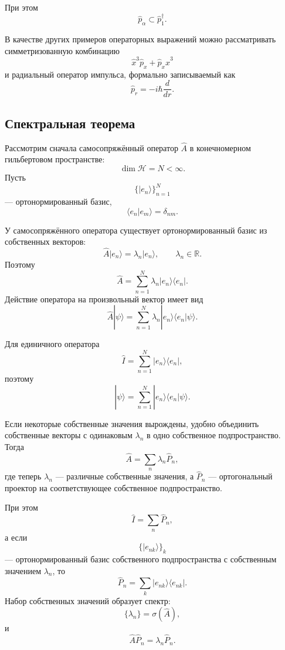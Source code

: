 \documentclass[12pt,a4paper]{article}
\begin{document}
При этом
\[
    \hat p_\alpha
    \subset
    \hat p_1^\dagger.
\]

В качестве других примеров операторных выражений можно рассматривать
симметризованную комбинацию
\[
    \boxed{
        \hat x^3\hat p_x
        +
        \hat p_x\hat x^3
    }
\]
и радиальный оператор импульса, формально записываемый как
\[
    \boxed{
        \hat p_r
        =
        -i\hbar\frac{d}{dr}
    }.
\]


\subsection{Спектральная теорема}

Рассмотрим сначала самосопряжённый оператор $\hat A$ в
конечномерном гильбертовом пространстве:
\[
    \dim\mathcal H=N<\infty.
\]
Пусть
\[
    \{|e_n\rangle\}_{n=1}^{N}
\]
--- ортонормированный базис,
\[
    \langle e_n|e_m\rangle
    =
    \delta_{nm}.
\]

У самосопряжённого оператора существует ортонормированный базис из
собственных векторов:
\[
    \boxed{
        \hat A|e_n\rangle
        =
        \lambda_n|e_n\rangle,
        \qquad
        \lambda_n\in\mathbb R
    }.
\]
Поэтому
\[
    \boxed{
        \hat A
        =
        \sum_{n=1}^{N}
        \lambda_n
        |e_n\rangle\langle e_n|
    }.
\]
Действие оператора на произвольный вектор имеет вид
\[
    \hat A|\psi\rangle
    =
    \sum_{n=1}^{N}
        \lambda_n
        |e_n\rangle
        \langle e_n|\psi\rangle.
\]

Для единичного оператора
\[
    \boxed{
        \hat I
        =
        \sum_{n=1}^{N}
        |e_n\rangle\langle e_n|
    },
\]
поэтому
\[
    |\psi\rangle
    =
    \sum_{n=1}^{N}
        |e_n\rangle
        \langle e_n|\psi\rangle.
\]

Если некоторые собственные значения вырождены, удобно объединить
собственные векторы с одинаковым $\lambda_n$ в одно собственное
подпространство. Тогда
\[
    \boxed{
        \hat A
        =
        \sum_n
        \lambda_n\hat P_n
    },
\]
где теперь $\lambda_n$ --- различные собственные значения, а
$\hat P_n$ --- ортогональный проектор на соответствующее собственное
подпространство.

При этом
\[
    \boxed{
        \hat I=\sum_n\hat P_n
    },
\]
а если
\[
    \{|e_{nk}\rangle\}_k
\]
--- ортонормированный базис собственного подпространства с
собственным значением $\lambda_n$, то
\[
    \boxed{
        \hat P_n
        =
        \sum_k
        |e_{nk}\rangle\langle e_{nk}|
    }.
\]
Набор собственных значений образует спектр:
\[
    \{\lambda_n\}
    =
    \sigma(\hat A),
\]
и
\[
    \boxed{
        \hat A\hat P_n
        =
        \lambda_n\hat P_n
    }.
\]
\end{document}

